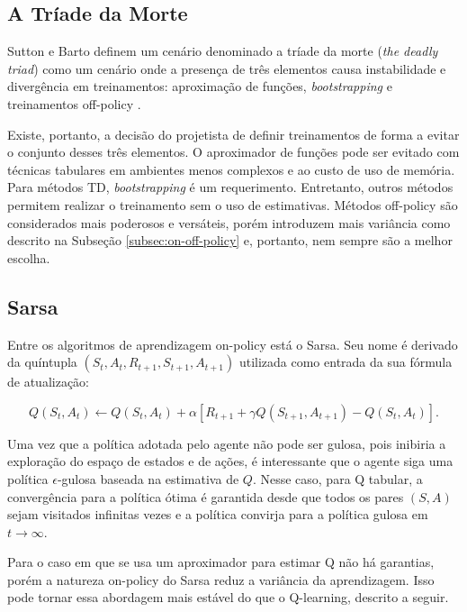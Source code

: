 \subsection{A Tríade da Morte}

Sutton e Barto definem um cenário denominado a tríade da morte (\textit{the deadly triad}) como um cenário onde a presença de três elementos causa instabilidade e divergência em treinamentos: aproximação de funções, \textit{bootstrapping} e treinamentos off-policy \cite{sutton2018reinforcement}.

Existe, portanto, a decisão do projetista de definir treinamentos de forma a evitar o conjunto desses três elementos. O aproximador de funções pode ser evitado com técnicas tabulares em ambientes menos complexos e ao custo de uso de memória. Para métodos TD, \textit{bootstrapping} é um requerimento. Entretanto, outros métodos permitem realizar o treinamento sem o uso de estimativas. Métodos off-policy são considerados mais poderosos e versáteis, porém introduzem mais variância como descrito na Subseção \ref{subsec:on-off-policy} e, portanto, nem sempre são a melhor escolha.

\subsection{Sarsa}
\label{subsec:sarsa-theory}
Entre os algoritmos de aprendizagem on-policy está o Sarsa. Seu nome é derivado da quíntupla $(S_t, A_t, R_{t+1}, S_{t+1}, A_{t+1})$ utilizada como entrada da sua fórmula de atualização:

\begin{equation}
	Q(S_t, A_t) \leftarrow Q(S_t, A_t) + \alpha[R_{t+1} + \gamma Q(S_{t+1}, A_{t+1}) - Q(S_t, A_t)].
\end{equation}

Uma vez que a política adotada pelo agente não pode ser gulosa, pois inibiria a exploração do espaço de estados e de ações, é interessante que o agente siga uma política $\epsilon$-gulosa baseada na estimativa de $Q$. Nesse caso, para Q tabular, a convergência para a política ótima é garantida desde que todos os pares $(S, A)$ sejam visitados infinitas vezes e a política convirja para a política gulosa em $t \to \infty$.

Para o caso em que se usa um aproximador para estimar Q não há garantias, porém a natureza on-policy do Sarsa reduz a variância da aprendizagem. Isso pode tornar essa abordagem mais estável do que o Q-learning, descrito a seguir.

